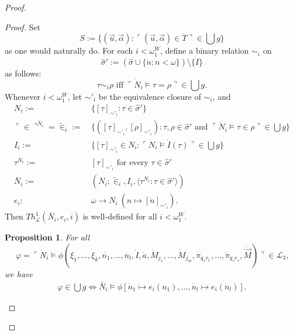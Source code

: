 \documentclass[12pt, twoside]{memoir}
\numberwithin{equation}{section}
\newtheorem{prop}[thm]{Proposition}
\theoremstyle{definition}
\theoremstyle{remark}
\theoremstyle{definition}
\theoremstyle{definition}
\theoremstyle{definition}
\theoremstyle{remark}
\begin{document}
\begin{proof}
\begin{proof}
Set
\begin{equation*}
    S := \{(\Vec{u}, \Vec{\alpha}) : \ulcorner (\Vec{u}, \Vec{\alpha}) \in \dot{T} \urcorner \in \bigcup g\} 
\end{equation*}
as one would naturally do. For each $i < \omega_1^W$, define a binary relation $\sim_i$ on 
\begin{equation*}
    \hat{\sigma}' := (\hat{\sigma} \cup \{\dot{n} : n < \omega\}) \setminus \{\dot{I}\} 
\end{equation*}
as follows: 
\begin{equation*}
    \tau \sim_i \rho \text{ iff } \ulcorner \dot{N}_i \models \tau = \rho \urcorner \in \bigcup g \text{.}
\end{equation*}
Whenever $i < \omega_1^W$, let $\sim'_i$ be the equivalence closure of $\sim_i$, and
\begin{align*}
    N_i := \ & \{[\tau]_{\sim'_i} : \tau \in \hat{\sigma}'\} \\
    \ulcorner \in \urcorner^{\bar{N}_i} = \tilde{\in}_i := \ & \{([\tau]_{\sim'_i}, [\rho]_{\sim'_i}) : \tau, \rho \in \hat{\sigma}' \text{ and } \ulcorner \dot{N}_i \models \tau \in \rho \urcorner \in \bigcup g\} \\
    I_i := \ & \{[\tau]_{\sim'_i} \in N_i : \ulcorner \dot{N}_i \models \dot{I}(\tau) \urcorner \in \bigcup g\} \\
    \tau^{\bar{N}_i} := \ & [\tau]_{\sim'_i} \text{ for every } \tau \in \hat{\sigma}' \\
    \bar{N}_i := \ & (N_i; \tilde{\in}_i, I_i, \langle \tau^{\bar{N}_i} : \tau \in \hat{\sigma}' \rangle) \\
    e_i : \ & \omega \longrightarrow N_i \ (n \mapsto [\dot{n}]_{\sim'_i}) \text{.}
\end{align*}
Then $Th^{1}_{\mathcal{L}}(\bar{N}_i, e_i, i)$ is well-defined for all $i < \omega_1^W$.

\begin{prop}\label{prop448}
For all
\begin{equation*}
    \varphi = \ulcorner \dot{N}_i \models \phi(\xi_1, \ldots, \xi_k, \dot{n_1}, \ldots, \dot{n_l}, \dot{I}, \dot{a}, \dot{M}_{j_1}, \ldots, \dot{M}_{j_m}, \dot{\pi}_{q_{1}r_{1}}, \ldots, \dot{\pi}_{q_{s}r_{s}}, \dot{\Vec{M}}) \urcorner \in \mathcal{L}_3 \text{,}
\end{equation*}
we have
\begin{gather*}
    \varphi \in \bigcup g \iff \bar{N}_i \models \phi[\dot{n}_1 \mapsto e_i(n_1), \ldots, \dot{n}_l \mapsto e_i(n_l)] \text{.}
\end{gather*}
\end{prop}


\end{proof}
\end{proof}
\end{document}
